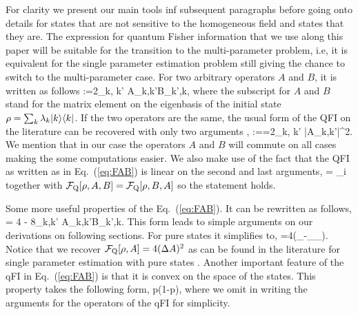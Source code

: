 For clarity we present our main tools inf subsequent paragraphs before going onto details for states that are not sensitive to the homogeneous field and states that they are.
The expression for quantum Fisher information that we use along this paper will be suitable for the transition to the multi-parameter problem, i.e, it is equivalent for the single parameter estimation problem still giving the chance to switch to the multi-parameter case.
For two arbitrary operators $A$ and $B$, it is written as follows
\be
  \label{eq:FAB}
  :=2\sum_{k, k'}
  {A}_{k,k'}{B}_{k',k},
\ee
where the subscript for $A$ and $B$ stand for the matrix element on the eigenbasis of the initial state $\rho = \sum_k\lambda_k\vert k \rangle\langle k \vert$.
If the two operators are the same, the usual form of the QFI on the literature can be recovered with only two arguments \citep{Paris2009,Braunstein1994,Holevo1982,Helstrom1976,Petz2002,Petz2008},
\be
  :==2\sum_{k, k'}
  |{A}_{k,k'}|^2.
\ee
We mention that in our case the operators $A$ and $B$ will commute on all cases making the some computations easier.
We also make use of the fact that the QFI as written as in Eq.~(\ref{eq:FAB}) is linear on the second and last arguments,
\be
  \label{eq:qfi-linear-in-arguments}
   = \sum_i 
\ee
together with $\mathcal{F}_{\textnormal{Q}}[{\textstyle \rho, A, B}] = \mathcal{F}_{\textnormal{Q}}[{\textstyle \rho, B,A}]$ so the statement holds.

Some more useful properties of the Eq.~(\ref{eq:FAB}).
It can be rewritten as follows,
\be
  \label{eq:QFI for two operators rewrited}
   = 4 
  - 8\sum_{k,k'}
  {A}_{k,k'}{B}_{k',k}.
\ee
This form leads to simple arguments on our derivations on following sections.
For pure states it simplifies to,
\be
  \label{eq:QFI_pure}
  =4\left(_{\psi}-_{\psi}_{\psi}\right).
\ee
Notice that we recover $\mathcal{F}_{\textnormal{Q}}[{\textstyle \rho,A}]=4(\Delta A)^2$ as can be found in the literature for single parameter estimation with pure states \citep{Paris2009,Toth2013}.
Another important feature of the qFI in Eq.~(\ref{eq:FAB}) is that it is convex on the space of the states.
This property takes the following form,
\be
  \leq
  p(1{-}p),
\ee
where we omit in writing the arguments for the operators of the qFI for simplicity.

